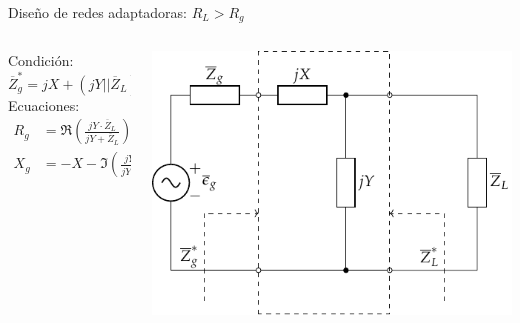\documentclass[aspectratio=169, usenames,svgnames,dvipsnames]{beamer}
\begin{document}
\begin{frame}[label={sec:orgf985f31}]{Diseño de redes adaptadoras: \(R_L > R_g\)}
\begin{columns}
\begin{column}{0.3\columnwidth}
Condición:
\[
  \overline{Z}^*_g = jX + (jY || \overline{Z}_L) 
\]
Ecuaciones:
\begin{align*}
  R_g &= \Re\left(\frac{jY \cdot \overline{Z}_L}{jY + \overline{Z}_L}\right)\\
  X_g &= -X - \Im\left(\frac{jY \cdot \overline{Z}_L}{jY + \overline{Z}_L}\right)
\end{align*}
\end{column}

\begin{column}{0.7\columnwidth}
\begin{center}
\includegraphics[height=0.8\textheight]{../figs/Everitt_XY1.pdf}
\end{center}
\end{column}
\end{columns}
\end{frame}
\end{document}
